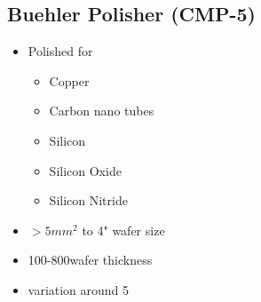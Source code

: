 \subsection{Buehler Polisher (CMP-5)}\label{cmp_machine_unclean}
\WaferNonStandard

\begin{minipage}[H]{\MachinePictureMiniPageWidth}
\end{minipage}\begin{minipage}[H]{\MachineTextMiniPageWidth}
\begin{itemize}
	\item Polished for
	\begin{itemize}
		\item Copper
		\item Carbon nano tubes
		\item Silicon
		\item Silicon Oxide 
		\item Silicon Nitride
	\end{itemize}
	\item $>5mm^2$ to 4" wafer size
	\item 100-800\um wafer thickness
	\item variation around 5\um
\end{itemize}
\end{minipage}